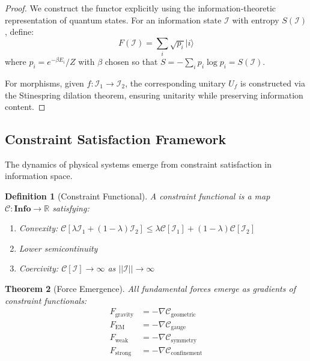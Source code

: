 \documentclass[12pt,a4paper]{article}
\newtheorem{theorem}{Theorem}[section]
\newtheorem{definition}[theorem]{Definition}
\begin{document}
\begin{proof}
We construct the functor explicitly using the information-theoretic representation of quantum states. For an information state $\mathcal{I}$ with entropy $S(\mathcal{I})$, define:
\begin{equation}
F(\mathcal{I}) = \sum_{i} \sqrt{p_i} |i\rangle
\end{equation}
where $p_i = e^{-\beta E_i}/Z$ with $\beta$ chosen so that $S = -\sum_i p_i \log p_i = S(\mathcal{I})$.

For morphisms, given $f: \mathcal{I}_1 \to \mathcal{I}_2$, the corresponding unitary $U_f$ is constructed via the Stinespring dilation theorem, ensuring unitarity while preserving information content.
\end{proof}

\subsection{Constraint Satisfaction Framework}

The dynamics of physical systems emerge from constraint satisfaction in information space.

\begin{definition}[Constraint Functional]
A constraint functional is a map $\mathcal{C}: \mathbf{Info} \to \mathbb{R}$ satisfying:
\begin{enumerate}
\item Convexity: $\mathcal{C}[\lambda \mathcal{I}_1 + (1-\lambda)\mathcal{I}_2] \leq \lambda \mathcal{C}[\mathcal{I}_1] + (1-\lambda)\mathcal{C}[\mathcal{I}_2]$
\item Lower semicontinuity
\item Coercivity: $\mathcal{C}[\mathcal{I}] \to \infty$ as $||\mathcal{I}|| \to \infty$
\end{enumerate}
\end{definition}

\begin{theorem}[Force Emergence]
All fundamental forces emerge as gradients of constraint functionals:
\begin{align}
F_{\text{gravity}} &= -\nabla \mathcal{C}_{\text{geometric}} \\
F_{\text{EM}} &= -\nabla \mathcal{C}_{\text{gauge}} \\
F_{\text{weak}} &= -\nabla \mathcal{C}_{\text{symmetry}} \\
F_{\text{strong}} &= -\nabla \mathcal{C}_{\text{confinement}}
\end{align}
\end{theorem}
\end{document}

